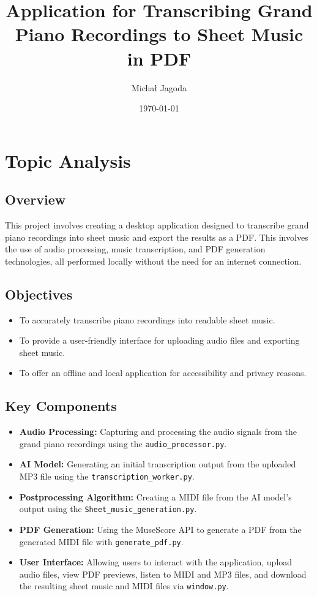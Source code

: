 \documentclass{article}
\title{Application for Transcribing Grand Piano Recordings to Sheet Music in PDF}
\author{Michał Jagoda}
\date{\today}
\begin{document}
\maketitle

\tableofcontents

\section{Topic Analysis}

\subsection{Overview}
This project involves creating a desktop application designed to transcribe grand piano recordings into sheet music and export the results as a PDF. This involves the use of audio processing, music transcription, and PDF generation technologies, all performed locally without the need for an internet connection.

\subsection{Objectives}
\begin{itemize}
    \item To accurately transcribe piano recordings into readable sheet music.
    \item To provide a user-friendly interface for uploading audio files and exporting sheet music.
    \item To offer an offline and local application for accessibility and privacy reasons.
\end{itemize}

\subsection{Key Components}
\begin{itemize}
    \item \textbf{Audio Processing:} Capturing and processing the audio signals from the grand piano recordings using the \texttt{audio\_processor.py}.
    \item \textbf{AI Model:} Generating an initial transcription output from the uploaded MP3 file using the \texttt{transcription\_worker.py}.
    \item \textbf{Postprocessing Algorithm:} Creating a MIDI file from the AI model's output using the \texttt{Sheet\_music\_generation.py}.
    \item \textbf{PDF Generation:} Using the MuseScore API to generate a PDF from the generated MIDI file with \texttt{generate\_pdf.py}.
    \item \textbf{User Interface:} Allowing users to interact with the application, upload audio files, view PDF previews, listen to MIDI and MP3 files, and download the resulting sheet music and MIDI files via \texttt{window.py}.
\end{itemize}
\end{document}
